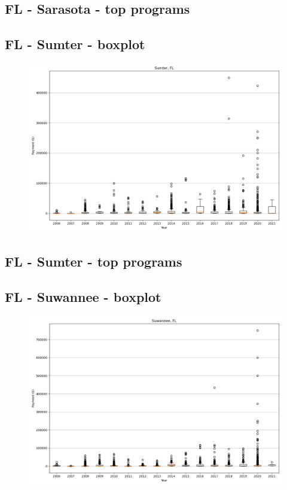 \subsection*{FL - Sarasota - top programs}

\newpage
\subsection*{FL - Sumter - boxplot}
\begin{figure}[h]
\centering
\includegraphics[width=7in]{../output/boxplots/counties/Sumter-FL_boxplot.png}
\end{figure}


\subsection*{FL - Sumter - top programs}

\newpage
\subsection*{FL - Suwannee - boxplot}
\begin{figure}[h]
\centering
\includegraphics[width=7in]{../output/boxplots/counties/Suwannee-FL_boxplot.png}
\end{figure}


